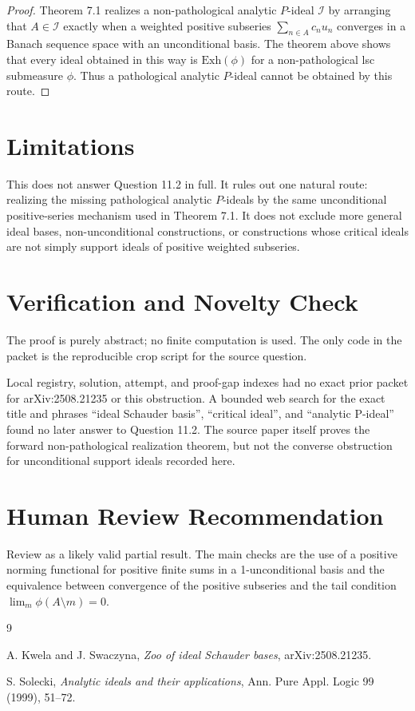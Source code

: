 \documentclass[11pt]{article}
\newcommand{\Exh}{\mathrm{Exh}}
\begin{document}
\begin{proof}
Theorem 7.1 realizes a non-pathological analytic \(P\)-ideal \(\mathcal I\)
by arranging that \(A\in\mathcal I\) exactly when a weighted positive subseries
\(\sum_{n\in A}c_nu_n\) converges in a Banach sequence space with an
unconditional basis.  The theorem above shows that every ideal obtained in
this way is \(\Exh(\phi)\) for a non-pathological lsc submeasure \(\phi\).
Thus a pathological analytic \(P\)-ideal cannot be obtained by this route.
\end{proof}

\section*{Limitations}

This does not answer Question 11.2 in full.  It rules out one natural route:
realizing the missing pathological analytic \(P\)-ideals by the same
unconditional positive-series mechanism used in Theorem 7.1.  It does not
exclude more general ideal bases, non-unconditional constructions, or
constructions whose critical ideals are not simply support ideals of positive
weighted subseries.

\section*{Verification and Novelty Check}

The proof is purely abstract; no finite computation is used.  The only code in
the packet is the reproducible crop script for the source question.

Local registry, solution, attempt, and proof-gap indexes had no exact prior
packet for arXiv:2508.21235 or this obstruction.  A bounded web search for the
exact title and phrases ``ideal Schauder basis'', ``critical ideal'', and
``analytic P-ideal'' found no later answer to Question 11.2.  The source paper
itself proves the forward non-pathological realization theorem, but not the
converse obstruction for unconditional support ideals recorded here.

\section*{Human Review Recommendation}

Review as a likely valid partial result.  The main checks are the use of a
positive norming functional for positive finite sums in a 1-unconditional
basis and the equivalence between convergence of the positive subseries and
the tail condition \(\lim_m\phi(A\setminus m)=0\).

\begin{thebibliography}{9}

A. Kwela and J. Swaczyna,
\emph{Zoo of ideal Schauder bases}, arXiv:2508.21235.

S. Solecki,
\emph{Analytic ideals and their applications},
Ann. Pure Appl. Logic 99 (1999), 51--72.

\end{thebibliography}
\end{document}
